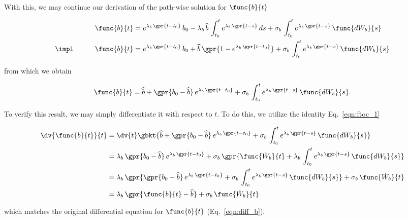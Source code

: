With this, we may continue our derivation of the path-wise solution for $\func{b}{t}$

\begin{alignat}{2}
    &	& \func{b}{t} &= e^{\lambda_{b}\,\gpr{t - t_0}}\,b_{0} - \lambda_{b}\,\widehat{b}\,\int_{t_{0}}^{t} e^{\lambda_b\,\gpr{t - s}}\,ds + \sigma_{b}\,\int_{t_{0}}^{t} e^{\lambda_b\,\gpr{t - s}}\,\func{d{W}_{b}}{s} \nonumber \\
    &\impl\qquad	& \func{b}{t} &= e^{\lambda_{b}\,\gpr{t - t_0}}\,b_{0} + \widehat{b}\,\gpr{1 - e^{\lambda_b\,\gpr{t - t_0}}} + \sigma_{b}\,\int_{t_{0}}^{t} e^{\lambda_b\,\gpr{t - s}}\,\func{d{W}_{b}}{s} 
\end{alignat}

from which we obtain

\begin{equation}
    \func{b}{t} = \widehat{b} + \gpr{b_0 - \widehat{b}}\,e^{\lambda_{b}\,\gpr{t - t_0}} + \sigma_{b}\,\int_{t_{0}}^{t} e^{\lambda_b\,\gpr{t - s}}\,\func{d{W}_{b}}{s}.
    \label{eqn:pathwise_b}
\end{equation}

To verify this result, we may simply differentiate it with respect to $t$. To do this, we utilize the identity Eq.~\ref{eqn:ftoc_1}

\begin{align}
    \dv{\func{b}{t}}{t} &= \dv{t} \gbkt{\widehat{b} + \gpr{b_0 - \widehat{b}}\,e^{\lambda_{b}\,\gpr{t - t_0}} + \sigma_{b}\,\int_{t_{0}}^{t} e^{\lambda_b\,\gpr{t - s}}\,\func{d{W}_{b}}{s}} \nonumber \\
     	&= \lambda_{b}\,\gpr{b_0 - \widehat{b}}\,e^{\lambda_{b}\,\gpr{t - t_0}} + \sigma_{b}\,\gpr{\func{\dot{W}_{b}}{t} + \lambda_b\,\int_{t_{0}}^{t} e^{\lambda_b\,\gpr{t - s}}\,\func{d{W}_{b}}{s}} \nonumber \\
     	&= \lambda_{b}\,\gpr{\gpr{b_0 - \widehat{b}}\,e^{\lambda_{b}\,\gpr{t - t_0}} + \sigma_{b}\,\int_{t_{0}}^{t} e^{\lambda_b\,\gpr{t - s}}\,\func{d{W}_{b}}{s}} + \sigma_{b}\,\func{\dot{W}_{b}}{t} \nonumber \\
     	&= \lambda_{b}\,\gpr{\func{b}{t} - \widehat{b}} + \sigma_{b}\,\func{\dot{W}_{b}}{t} 
\end{align}

which matches the original differential equation for $\func{b}{t}$ (Eq.~\ref{eqn:diff_b}).